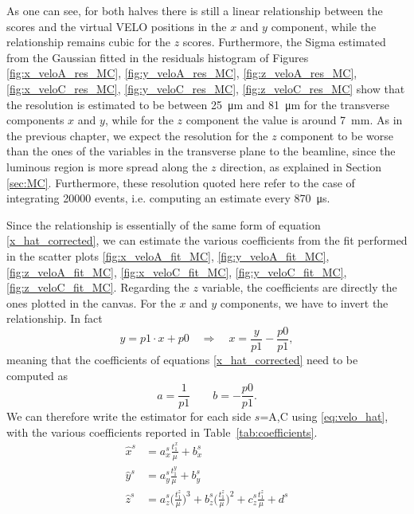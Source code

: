 As one can see, for both halves there is still a linear relationship between the scores and the virtual VELO positions in the $x$ and $y$ component, while the relationship remains cubic for the $z$ scores.  Furthermore, the Sigma estimated from the Gaussian fitted in the residuals histogram of Figures \ref{fig:x_veloA_res_MC}, \ref{fig:y_veloA_res_MC}, \ref{fig:z_veloA_res_MC}, \ref{fig:x_veloC_res_MC}, \ref{fig:y_veloC_res_MC}, \ref{fig:z_veloC_res_MC} show that the resolution is estimated to be between \SI{25}{\micro\meter} and \SI{81}{\micro\meter} for the transverse components $x$ and $y$, while for the $z$ component the value is around \SI{7}{\milli\meter}. As in the previous chapter, we expect the resolution for the $z$ component to be worse than the ones of the variables in the transverse plane to the beamline, since the luminous region is more spread along the $z$ direction, as explained in Section \ref{sec:MC}. Furthermore, these resolution quoted here refer to the case of integrating 20000 events, i.e. computing an estimate every \SI{870}{\micro\second}.

Since the relationship is essentially of the same form of equation \eqref{x_hat_corrected}, we can estimate the various coefficients from the fit performed in the scatter plots \ref{fig:x_veloA_fit_MC}, \ref{fig:y_veloA_fit_MC}, \ref{fig:z_veloA_fit_MC}, \ref{fig:x_veloC_fit_MC}, \ref{fig:y_veloC_fit_MC}, \ref{fig:z_veloC_fit_MC}. Regarding the $z$ variable, the coefficients are directly the ones plotted in the canvas. For the $x$ and $y$ components, we have to invert the relationship. In fact
\begin{equation}
    y = p1\cdot x +p0 \quad  \Longrightarrow \quad  x = \frac{y}{p1}-\frac{p0}{p1},
\end{equation}
meaning that the coefficients of equations \eqref{x_hat_corrected} need to be computed as 
\begin{equation}
    a = \frac{1}{p1} \qquad b = -\frac{p0}{p1}.
\end{equation}
We can therefore write the estimator for each side $s$=A,C using \eqref{eq:velo_hat}, with the various coefficients reported in Table~\ref{tab:coefficients}.
\begin{equation}
\begin{split}
    \hat{x}^{s} &= a_x^s \frac{t^x_1}{\mu} + b_x^s\\%
    \hat{y}^{s} &=a_y^s \frac{t^y_1}{\mu} + b_y^s \\%
    \hat{z}^{s} &=a_z^s\biggl(\frac{t^z_1}{\mu}\biggr)^3 + b_z^s\biggl(\frac{t^z_1}{\mu}\biggr)^2 + c_z^s \frac{t^z_1}{\mu} + d^s
    \end{split} \label{eq:velo_hat}
    \end{equation}
    
